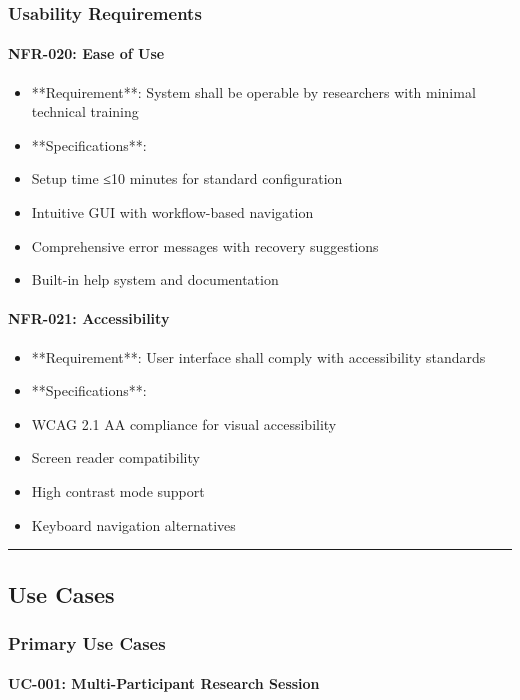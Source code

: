 \documentclass[11pt,a4paper]{report}
\begin{document}
\subsubsection{Usability Requirements}

\paragraph{NFR-020: Ease of Use}

\begin{itemize}
\item **Requirement**: System shall be operable by researchers with minimal technical training
\item **Specifications**:
\item Setup time ≤10 minutes for standard configuration
\item Intuitive GUI with workflow-based navigation
\item Comprehensive error messages with recovery suggestions
\item Built-in help system and documentation

\end{itemize}
\paragraph{NFR-021: Accessibility}

\begin{itemize}
\item **Requirement**: User interface shall comply with accessibility standards
\item **Specifications**:
\item WCAG 2.1 AA compliance for visual accessibility
\item Screen reader compatibility
\item High contrast mode support
\item Keyboard navigation alternatives

\end{itemize}
\hrule

\subsection{Use Cases}

\subsubsection{Primary Use Cases}

\paragraph{UC-001: Multi-Participant Research Session}
\end{document}
